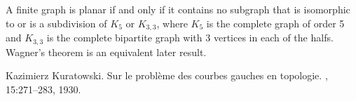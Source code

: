 \documentclass{article}
\begin{document}
A finite graph is planar if and only if it contains no subgraph that is isomorphic to or is a subdivision of $K_5$ or $K_{3,3}$, where $K_5$ is the complete graph of order 5 and $K_{3,3}$ is the complete bipartite graph with 3 vertices in each of the halfs. Wagner's theorem is an equivalent later result.

\begin{thebibliography}{1}

Kazimierz Kuratowski.
\newblock Sur le probl{\`e}me des courbes gauches en topologie.
, 15:271--283, 1930.

\end{thebibliography}

\end{document}
